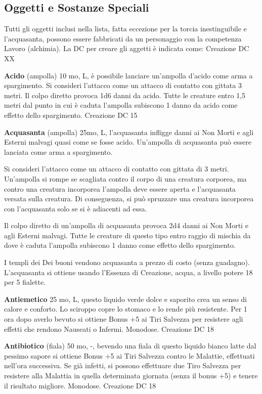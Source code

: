 \documentclass[a4paper,11pt,twoside,openany]{book}
\begin{document}
\subsection{Oggetti e Sostanze Speciali}

\label{oggetti-e-sostanze-speciali}

Tutti gli oggetti inclusi nella lista, fatta eccezione per la torcia inestinguibile e l'acquasanta, possono essere fabbricati da un personaggio con la competenza Lavoro (alchimia). La DC per creare gli aggetti è indicata come: Creazione DC XX

\textbf{Acido} (ampolla) 10 mo, L, è possibile lanciare un'ampolla d'acido come arma a spargimento. Si consideri l'attacco come un attacco di contatto con gittata 3 metri. Il colpo diretto provoca 1d6 danni da acido. Tutte le creature entro 1,5 metri dal punto in cui è caduta l'ampolla subiscono 1 danno da acido come effetto dello spargimento.
Creazione DC 15

\textbf{Acquasanta} (ampolla) 25mo, L, l'acquasanta infligge danni ai Non Morti e agli Esterni malvagi quasi come se fosse acido. Un'ampolla di acquasanta può essere lanciata come arma a spargimento.

Si consideri l'attacco come un attacco di contatto con gittata di 3 metri. Un'ampolla si rompe se scagliata contro il corpo di una creatura corporea, ma contro una creatura incorporea l'ampolla deve essere aperta e l'acquasanta versata sulla creatura. Di conseguenza, si può spruzzare una creatura incorporea con l'acquasanta solo se si è adiacenti ad essa.

Il colpo diretto di un'ampolla di acquasanta provoca 2d4 danni ai Non Morti e agli Esterni malvagi. Tutte le creature di questo tipo entro raggio di mischia da dove è caduta l'ampolla subiscono 1 danno come effetto dello spargimento.

I templi dei Dei buoni vendono acquasanta a prezzo di costo (senza guadagno). L'acquasanta si ottiene usando l'Essenza di Creazione, acqua, a livello potere 18 per 5 fialette.

\textbf{Antiemetico} 25 mo, L, questo liquido verde dolce e saporito crea un senso di calore e conforto. Lo sciroppo copre lo stomaco e lo rende più resistente. Per 1 ora dopo averlo bevuto si ottiene Bonus +5 ai Tiri Salvezza per resistere agli effetti che rendono Nauseati o Infermi. Monodose. Creazione DC 18

\textbf{Antibiotico} (fiala) 50 mo, -,  bevendo una fiala di questo liquido bianco latte dal pessimo sapore si ottiene Bonus +5 ai Tiri Salvezza contro le Malattie, effettuati nell'ora successiva. Se già infetti, si possono effettuare due Tiro Salvezza per resistere alla Malattia in quella determinata giornata (senza il bonus +5) e tenere il risultato migliore. Monodose. Creazione DC 18
\end{document}
